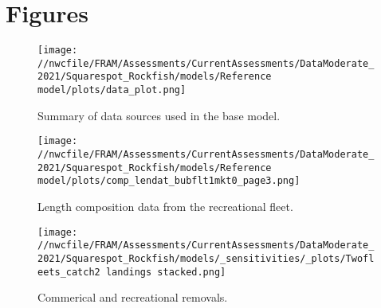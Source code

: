 \documentclass[11pt,
  english,
  a4paper,
]{article}
\begin{document}


\clearpage

\clearpage


\hypertarget{figures}{%
\section{Figures}\label{figures}}

\leavevmode\tagmcend\tagstructend


\begin{figure}
\centering
\texttt{[image: //nwcfile/FRAM/Assessments/CurrentAssessments/DataModerate\_2021/Squarespot\_Rockfish/models/Reference model/plots/data\_plot.png]}
\caption{Summary of data sources used in the base model.\label{fig:data-plot}}
\end{figure}

\tagmcend\tagstructend


\begin{figure}
\centering
\texttt{[image: //nwcfile/FRAM/Assessments/CurrentAssessments/DataModerate\_2021/Squarespot\_Rockfish/models/Reference model/plots/comp\_lendat\_bubflt1mkt0\_page3.png]}
\caption{Length composition data from the recreational fleet.\label{fig:rec-len-data}}
\end{figure}

\tagmcend\tagstructend


\begin{figure}
\centering
\texttt{[image: //nwcfile/FRAM/Assessments/CurrentAssessments/DataModerate\_2021/Squarespot\_Rockfish/models/\_sensitivities/\_plots/Twofleets\_catch2 landings stacked.png]}
\caption{Commerical and recreational removals.\label{fig:twofleetcatch}}
\end{figure}

\tagmcend\tagstructend

\end{document}
